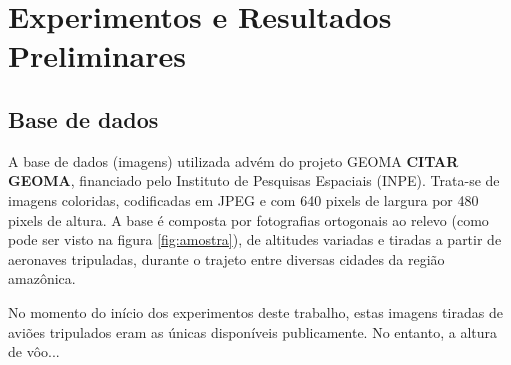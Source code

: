 \chapter{Experimentos e Resultados Preliminares}

\section{Base de dados}

A base de dados (imagens) utilizada advém do projeto GEOMA \textbf{CITAR GEOMA}, financiado pelo Instituto de Pesquisas Espaciais (INPE). Trata-se de imagens coloridas, codificadas em JPEG e com 640 pixels de largura por 480 pixels de altura. A base é composta por fotografias ortogonais ao relevo (como pode ser visto na figura \ref{fig:amostra}), de altitudes variadas e tiradas a partir de aeronaves tripuladas, durante o trajeto entre diversas cidades da região amazônica.

No momento do início dos experimentos deste trabalho, estas imagens tiradas de aviões tripulados eram as únicas disponíveis publicamente. No entanto, a altura de vôo...

